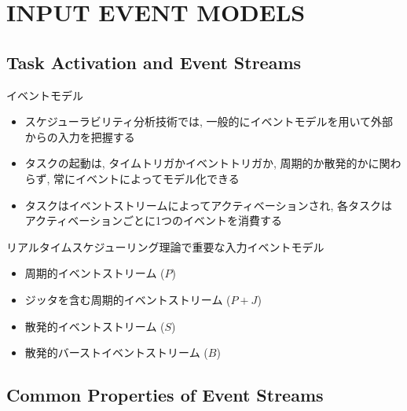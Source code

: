 
\section{INPUT EVENT MODELS}
\label{sec: input event models}

\subsection{Task Activation and Event Streams}
\label{ssec: task activation and event streams}

\begin{frame}{イベントモデル}
    \begin{itemize}
        \item スケジューラビリティ分析技術では, 一般的にイベントモデルを用いて外部からの入力を把握する
        \item タスクの起動は, タイムトリガかイベントトリガか, 周期的か散発的かに関わらず, 常にイベントによってモデル化できる
        \item タスクはイベントストリームによってアクティベーションされ, 各タスクはアクティベーションごとに1つのイベントを消費する
    \end{itemize}
\end{frame}

\begin{frame}{リアルタイムスケジューリング理論で重要な入力イベントモデル}
    \begin{itemize}
        \item 周期的イベントストリーム ($P$)
        \item ジッタを含む周期的イベントストリーム ($P + J$)
        \item 散発的イベントストリーム ($S$)
        \item 散発的バーストイベントストリーム ($B$)
    \end{itemize}
\end{frame}


\subsection{Common Properties of Event Streams}
\label{ssec: common properties of event streams}


